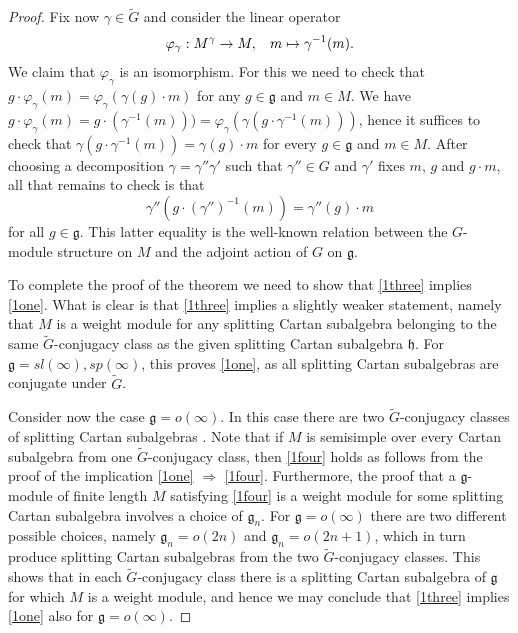 \documentclass{amsart}
\renewcommand{\sl}{sl}
\newcommand{\so}{o}
\renewcommand{\sp}{sp}
\renewcommand{\gg}{\mathfrak{g}}
\newcommand{\hh}{\mathfrak{h}}
\theoremstyle{definition}
\numberwithin{equation}{section}
\begin{document}
\begin{proof}
Fix now $\gamma \in \tilde{G}$ and consider the linear operator
$$\varphi_\gamma : M^\gamma \rightarrow M, \hspace{2ex} m \mapsto \gamma^{-1} (m).$$
We claim that $\varphi_\gamma$ is an isomorphism.  For this we need to check that $g \cdot \varphi_\gamma (m) = \varphi_\gamma (\gamma (g) \cdot m)$ for any $g \in \gg$ and $m \in M$.  We have $g \cdot \varphi_\gamma (m) = g \cdot (\gamma^{-1} (m))) = \varphi_\gamma (\gamma (g \cdot \gamma^{-1} (m)))$, hence it suffices to check that $\gamma (g \cdot \gamma^{-1} (m)) = \gamma (g) \cdot m$ for every $g \in \gg$ and $m \in M$.  After choosing a decomposition $\gamma = \gamma'' \gamma'$ such that $\gamma'' \in G$ and $\gamma'$ fixes $m$, $g$ and $g \cdot m$, all that remains to check is that
\begin{equation*}
\gamma'' (g \cdot (\gamma'')^{-1} (m)) = \gamma'' (g) \cdot m
\end{equation*}
for all $g \in \gg$.  This latter equality is the well-known relation between the $G$-module structure on $M$ and the adjoint action of $G$ on $\gg$.

To complete the proof of the theorem we need to show that
\eqref{1three} implies \eqref{1one}.  What is clear is that
\eqref{1three} implies a slightly weaker statement, namely that $M$ is
a weight module for any splitting Cartan subalgebra belonging to the
same $\tilde{G}$-conjugacy class as the given splitting Cartan
subalgebra $\hh$.  For $\gg = \sl(\infty), \sp(\infty)$, this proves
\eqref{1one}, as all splitting Cartan subalgebras are conjugate under
$\tilde{G}$.  

Consider now the case $\gg=\so(\infty)$. In this case there are two $\tilde{G}$-conjugacy classes of
splitting Cartan subalgebras \cite{DPS}. Note that if $M$ is
semisimple over every Cartan subalgebra from one $\tilde{G}$-conjugacy
class, then   \eqref{1four} holds as follows from the proof of the implication
\eqref{1one} $\Rightarrow$ \eqref{1four}.  
Furthermore, the proof
that a $\gg$-module of finite length $M$ satisfying \eqref{1four} is a weight module for some
splitting Cartan subalgebra involves a choice of $\gg_n$.
For $\gg=\so(\infty)$ there are two different possible choices, namely $\gg_n=\so(2n)$ and $\gg_n=\so(2n+1)$, which in turn produce splitting Cartan subalgebras from the two $\tilde{G}$-conjugacy classes.  This shows that in each $\tilde{G}$-conjugacy class there is a splitting Cartan subalgebra of $\gg$ for which $M$ is a weight module, and hence we may conclude that \eqref{1three} implies \eqref{1one} also for $\gg= \so(\infty)$.
\end{proof}
\end{document}
